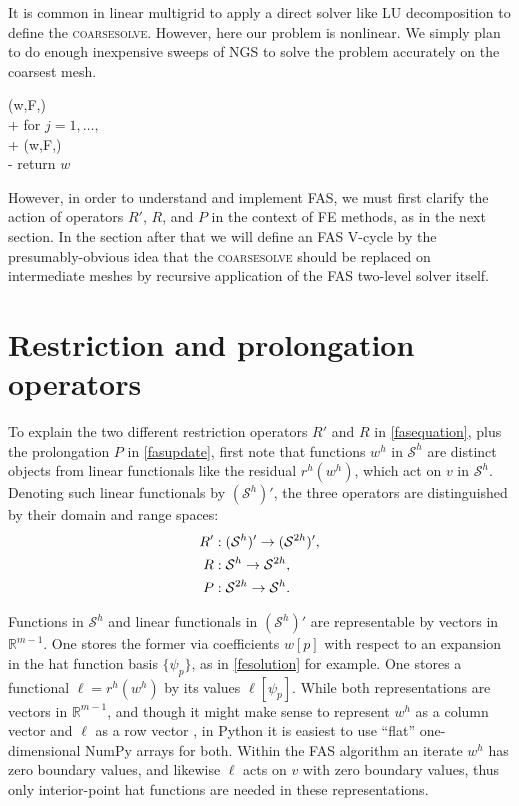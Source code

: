 \documentclass[letterpaper,final,12pt,reqno]{amsart}
\newcommand{\RR}{\mathbb{R}}
\begin{document}
It is common in linear multigrid \cite{Briggsetal2000,Bueler2021,Trottenbergetal2001} to apply a direct solver like LU decomposition to define the \textsc{coarsesolve}.  However, here our problem is nonlinear.  We simply plan to do enough inexpensive sweeps of NGS to solve the problem accurately on the coarsest mesh.

\begin{pseudo*}
(w,F,\ell)\text{:} \\+
    for $j=1,\dots,$ \\+
        (w,F,\ell) \\-
    return $w$
\end{pseudo*}

However, in order to understand and implement FAS, we must first clarify the action of operators $R'$, $R$, and $P$ in the context of FE methods, as in the next section.  In the section after that we will define an FAS V-cycle by the presumably-obvious idea that the \textsc{coarsesolve} should be replaced on intermediate meshes by recursive application of the FAS two-level solver itself.


\section{Restriction and prolongation operators}

To explain the two different restriction operators $R'$ and $R$ in \eqref{fasequation}, plus the prolongation $P$ in \eqref{fasupdate}, first note that functions $w^h$ in $\mathcal{S}^h$ are distinct objects from linear functionals like the residual $r^h(w^h)$, which act on $v$ in $\mathcal{S}^h$.  Denoting such linear functionals by $(\mathcal{S}^h)'$, the three operators are distinguished by their domain and range spaces:
\begin{align}
  R' &: (\mathcal{S}^h)' \to (\mathcal{S}^{2h})', \label{rpoperators} \\
  R  &: \mathcal{S}^h \to \mathcal{S}^{2h}, \notag \\
  P  &: \mathcal{S}^{2h} \to \mathcal{S}^h. \notag
\end{align}

Functions in $\mathcal{S}^h$ and linear functionals in $(\mathcal{S}^h)'$ are representable by vectors in $\RR^{m-1}$.  One stores the former via coefficients $w[p]$ with respect to an expansion in the hat function basis $\{\psi_p\}$, as in \eqref{fesolution} for example.  One stores a functional $\ell=r^h(w^h)$ by its values $\ell[\psi_p]$.  While both representations are vectors in $\RR^{m-1}$, and though it might make sense to represent $w^h$ as a column vector and $\ell$ as a row vector \cite{TrefethenBau1997}, in Python it is easiest to use ``flat'' one-dimensional NumPy arrays for both.  Within the FAS algorithm an iterate $w^h$ has zero boundary values, and likewise $\ell$ acts on $v$ with zero boundary values, thus only interior-point hat functions are needed in these representations.
\end{document}
